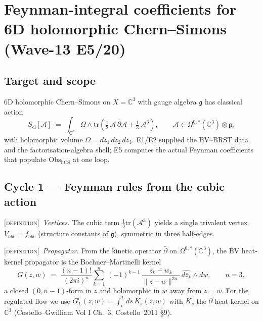\section{Feynman-integral coefficients for 6D holomorphic Chern--Simons (Wave-13 E5/20)}
\label{wn:sec:wave13-e5-feynman-coefficients}

\providecommand{\ClaimStatusTheorem}{\textsc{[theorem]}}
\providecommand{\ClaimStatusConjectured}{\textsc{[conjectural]}}
\providecommand{\ClaimStatusHeuristic}{\textsc{[heuristic]}}
\providecommand{\ClaimStatusDefinition}{\textsc{[definition]}}
\providecommand{\kch}{\kappa_{\mathrm{ch}}}
\providecommand{\kcat}{\kappa_{\mathrm{cat}}}
\providecommand{\kBKM}{\kappa_{\mathrm{BKM}}}
\providecommand{\kfib}{\kappa_{\mathrm{fiber}}}
\providecommand{\cA}{\mathcal{A}}
\providecommand{\cO}{\mathcal{O}}
\providecommand{\Obs}{\mathrm{Obs}}
\providecommand{\hCS}{\mathrm{hCS}}
\providecommand{\CC}{\mathbb{C}}
\providecommand{\RR}{\mathbb{R}}
\providecommand{\gfrak}{\mathfrak{g}}
\providecommand{\uone}{\mathfrak{u}(1)}
\providecommand{\sun}{\mathfrak{su}(N)}
\providecommand{\Cas}{C_2(\gfrak)}

\subsection{Target and scope}

6D holomorphic Chern--Simons on $X = \CC^3$ with gauge algebra $\gfrak$ has
classical action
\[
S_{\mathrm{cl}}[\cA] \;=\; \int_{\CC^3}\Omega \wedge \mathrm{tr}\!\left(
\tfrac{1}{2}\,\cA\,\bar\partial\cA + \tfrac{1}{3}\,\cA^3\right),
\qquad \cA \in \Omega^{0,*}(\CC^3)\otimes\gfrak,
\]
with holomorphic volume $\Omega = dz_1\,dz_2\,dz_3$. E1/E2 supplied the
BV--BRST data and the factorisation-algebra shell; E5 computes the actual
Feynman coefficients that populate $\Obs_{\hCS}$ at one loop.

\subsection{Cycle 1 --- Feynman rules from the cubic action}

\ClaimStatusDefinition\ \emph{Vertices.} The cubic term
$\tfrac{1}{3}\mathrm{tr}(\cA^3)$ yields a single trivalent vertex
$V_{abc} = f_{abc}$ (structure constants of $\gfrak$), symmetric in three
half-edges.

\ClaimStatusDefinition\ \emph{Propagator.} From the kinetic operator
$\bar\partial$ on $\Omega^{0,*}(\CC^3)$, the BV heat-kernel propagator is
the Bochner--Martinelli kernel
\[
G(z,w) \;=\; \frac{(n-1)!}{(2\pi i)^n}
\sum_{k=1}^{n}\,(-1)^{k-1}\,
\frac{\overline{z_k - w_k}}{\|z-w\|^{2n}}\,
\widehat{d\bar z_k}\wedge dw,
\qquad n=3,
\]
a closed $(0,n{-}1)$-form in $z$ and holomorphic in $w$ away from
$z=w$. For the regulated flow we use $G_L^\epsilon(z,w) =
\int_\epsilon^L ds\,K_s(z,w)$ with $K_s$ the $\bar\partial$-heat kernel
on $\CC^3$ (Costello--Gwilliam Vol I Ch.~3, Costello~2011 \S9).

